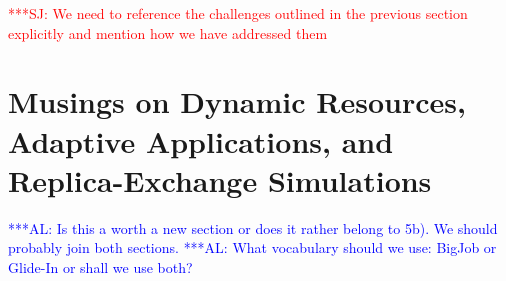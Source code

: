 \documentclass{rspublic}
\newcommand{\alnote}[1]{ {\textcolor{blue} { ***AL: #1 }}}
\newcommand{\jhanote}[1]{ {\textcolor{red} { ***SJ: #1 }}}
\newcommand{\alnote}[1]{}
\newcommand{\jhanote}[1]{}
\newcommand{\glidein}[1]{Glide-In }
\begin{document}
{%



               

  
    



\jhanote{We need to reference the challenges outlined in the previous
  section explicitly and mention how we have addressed them}

\section{Musings on Dynamic Resources, Adaptive Applications, and
  Replica-Exchange Simulations}      
\label{sec:adaptivitiy}    
\alnote{Is this a worth a new section or does it rather belong to 5b). We
should probably join both sections.}   
\alnote{What vocabulary should we use: BigJob or Glide-In or shall we use both?}

}
\end{document}
